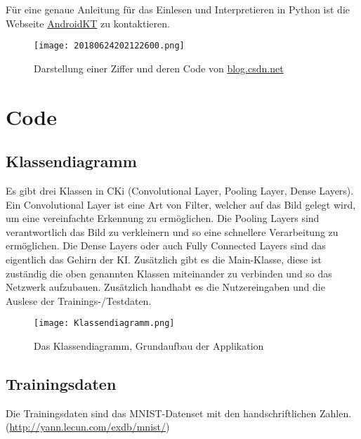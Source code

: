 Für eine genaue Anleitung für das Einlesen und Interpretieren in Python ist die Webseite \href{https://androidkt.com/extract-images-from-mnist-idx3-ubyte-file-format-in-python/}{AndroidKT} zu kontaktieren.

\begin{figure}[H]
\centering
\texttt{[image: 20180624202122600.png]}
\caption{Darstellung einer Ziffer und deren Code von \href{https://blog.csdn.net/qq_41185868/article/details/79094752}{blog.csdn.net}}
\label{fig:designubytecomp}
\end{figure}



\section{Code}
\label{sec:DesignCode}
\subsection{Klassendiagramm}
\label{sec:DesignKlassendiagramm}
 Es gibt drei Klassen in CKi (Convolutional Layer, Pooling Layer, Dense Layers). Ein Convolutional Layer ist eine Art von Filter, welcher auf das Bild gelegt wird, um eine vereinfachte Erkennung zu ermöglichen. Die Pooling Layers sind verantwortlich das Bild zu verkleinern und so eine schnellere Verarbeitung zu ermöglichen. Die Dense Layers oder auch Fully Connected Layers sind das eigentlich das Gehirn der KI. Zusätzlich gibt es die Main-Klasse, diese ist zuständig die oben genannten Klassen miteinander zu verbinden und so das Netzwerk aufzubauen. Zusätzlich handhabt es die Nutzereingaben und die Auslese der Trainings-/Testdaten. 

\begin{figure}[H]
\centering
\texttt{[image: Klassendiagramm.png]}
\caption{Das Klassendiagramm, Grundaufbau der Applikation}
\label{fig:designklassendiagramm}
\end{figure}

\subsection{Trainingsdaten}
\label{sec:DesignTrainingsdaten}
Die Trainingsdaten sind das MNIST-Datenset mit den handschriftlichen Zahlen. (\url{http://yann.lecun.com/exdb/mnist/})

